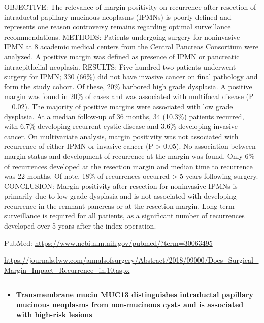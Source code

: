 \documentclass[]{article}
\providecommand{\tightlist}{%
  \setlength{\itemsep}{0pt}\setlength{\parskip}{0pt}}
\begin{document}
OBJECTIVE: The relevance of margin positivity on recurrence after
resection of intraductal papillary mucinous neoplasms (IPMNs) is poorly
defined and represents one reason controversy remains regarding optimal
surveillance recommendations. METHODS: Patients undergoing surgery for
noninvasive IPMN at 8 academic medical centers from the Central Pancreas
Consortium were analyzed. A positive margin was defined as presence of
IPMN or pancreatic intraepithelial neoplasia. RESULTS: Five hundred two
patients underwent surgery for IPMN; 330 (66\%) did not have invasive
cancer on final pathology and form the study cohort. Of these, 20\%
harbored high grade dysplasia. A positive margin was found in 20\% of
cases and was associated with multifocal disease (P = 0.02). The
majority of positive margins were associated with low grade dysplasia.
At a median follow-up of 36 months, 34 (10.3\%) patients recurred, with
6.7\% developing recurrent cystic disease and 3.6\% developing invasive
cancer. On multivariate analysis, margin positivity was not associated
with recurrence of either IPMN or invasive cancer (P \textgreater{}
0.05). No association between margin status and development of
recurrence at the margin was found. Only 6\% of recurrences developed at
the resection margin and median time to recurrence was 22 months. Of
note, 18\% of recurrences occurred \textgreater{} 5 years following
surgery. CONCLUSION: Margin positivity after resection for noninvasive
IPMNs is primarily due to low grade dysplasia and is not associated with
developing recurrence in the remnant pancreas or at the resection
margin. Long-term surveillance is required for all patients, as a
significant number of recurrences developed over 5 years after the index
operation.

PubMed: \url{https://www.ncbi.nlm.nih.gov/pubmed/?term=30063495}

\url{https://journals.lww.com/annalsofsurgery/Abstract/2018/09000/Does_Surgical_Margin_Impact_Recurrence_in.10.aspx}

{}

{}

\begin{center}\rule{0.5\linewidth}{\linethickness}\end{center}

\begin{itemize}
\tightlist
\item
  \textbf{Transmembrane mucin MUC13 distinguishes intraductal papillary
  mucinous neoplasms from non-mucinous cysts and is associated with
  high-risk lesions}
\end{itemize}
\end{document}
